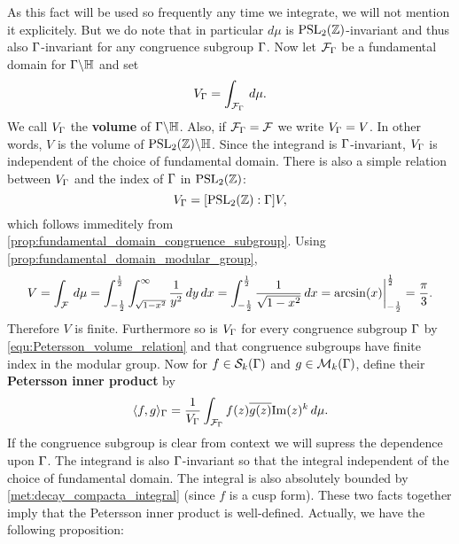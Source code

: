       As this fact will be used so frequently any time we integrate, we will not mention it explicitely. But we do note that in particular $d\mu$ is $\mathrm{PSL}_{2}(\mathbb{Z})$-invariant and thus also $\Gamma$-invariant for any congruence subgroup $\Gamma$. Now let $\mathcal{F}_{\Gamma}$ be a fundamental domain for $\Gamma\backslash\mathbb{H}$ and set
      \[
        V_{\Gamma} = \int_{\mathcal{F}_{\Gamma}}\,d\mu.
      \]
      We call $V_{\Gamma}$ the \textbf{volume} of $\Gamma\backslash\mathbb{H}$. Also, if $\mathcal{F}_{\Gamma} = \mathcal{F}$ we write $V_{\Gamma} = V$. In other words, $V$ is the volume of $\mathrm{PSL}_{2}(\mathbb{Z})\backslash\mathbb{H}$. Since the integrand is $\Gamma$-invariant, $V_{\Gamma}$ is independent of the choice of fundamental domain. There is also a simple relation between $V_{\Gamma}$ and the index of $\Gamma$ in $\mathrm{PSL}_{2}(\mathbb{Z})$:
      \begin{equation}\label{equ:Petersson_volume_relation}
        V_{\Gamma} = [\mathrm{PSL}_{2}(\mathbb{Z}):\Gamma]V,
      \end{equation}
      which follows immeditely from \cref{prop:fundamental_domain_congruence_subgroup}. Using \cref{prop:fundamental_domain_modular_group},
      \[
        V = \int_{\mathcal{F}}\,d\mu = \int_{-\frac{1}{2}}^{\frac{1}{2}}\int_{\sqrt{1-x^{2}}}^{\infty}\frac{1}{y^{2}}\,dy\,dx = \int_{-\frac{1}{2}}^{\frac{1}{2}}\frac{1}{\sqrt{1-x^{2}}}\,dx = \arcsin(x)\bigg|_{-\frac{1}{2}}^{\frac{1}{2}} = \frac{\pi}{3}.
      \]
      Therefore $V$ is finite. Furthermore so is $V_{\Gamma}$ for every congruence subgroup $\Gamma$ by \cref{equ:Petersson_volume_relation} and that congruence subgroups have finite index in the modular group. Now for $f \in \mathcal{S}_{k}(\Gamma)$ and $g \in \mathcal{M}_{k}(\Gamma)$, define their \textbf{Petersson inner product} by
      \[
        \langle f,g\rangle_{\Gamma} = \frac{1}{V_{\Gamma}}\int_{\mathcal{F}_{\Gamma}}f(z)\overline{g(z)}\mathrm{Im}(z)^{k}\,d\mu.
      \]
      If the congruence subgroup is clear from context we will supress the dependence upon $\Gamma$. The integrand is also $\Gamma$-invariant so that the integral independent of the choice of fundamental domain. The integral is also absolutely bounded by \cref{met:decay_compacta_integral} (since $f$ is a cusp form). These two facts together imply that the Petersson inner product is well-defined. Actually, we have the following proposition:

